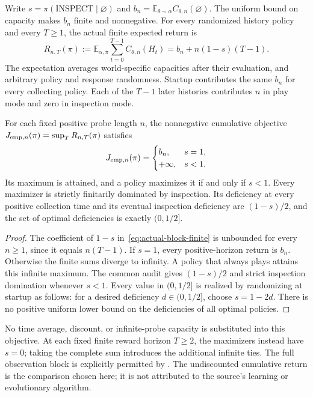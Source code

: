 Write $s=\pi(\mathrm{INSPECT}\mid\varnothing)$ and
$b_n=\mathbb E_{\theta\sim\alpha}C_{\theta,n}(\varnothing)$.
The uniform bound on capacity makes $b_n$ finite and nonnegative.
For every randomized history policy and every $T\ge1$, the actual finite
expected return is
\begin{equation}\label{eq:actual-block-finite}
 R_{n,T}(\pi):=\mathbb E_{\alpha,\pi}\sum_{t=0}^{T-1}C_{\theta,n}(H_t)
 =b_n+n(1-s)(T-1).
\end{equation}
The expectation averages world-specific capacities after their evaluation,
and arbitrary policy and response randomness. Startup contributes the same
$b_n$ for every collecting policy. Each of the $T-1$ later histories contributes
$n$ in play mode and zero in inspection mode.

\begin{proposition}\label{prop:actual-block-complete}
For each fixed positive probe length $n$, the nonnegative cumulative objective
$J_{{\rm emp},n}(\pi)=\sup_T R_{n,T}(\pi)$ satisfies
\[
 J_{{\rm emp},n}(\pi)=
 \begin{cases}b_n,&s=1,\\+\infty,&s<1.\end{cases}
\]
Its maximum is attained, and a policy maximizes it if and only if $s<1$.
Every maximizer is strictly finitarily dominated by inspection. Its deficiency
at every positive collection time and its eventual inspection deficiency are
$(1-s)/2$, and the set of optimal deficiencies is exactly $(0,1/2]$.
\end{proposition}
\begin{proof}
The coefficient of $1-s$ in~\eqref{eq:actual-block-finite} is unbounded for
every $n\ge1$, since it equals $n(T-1)$.
If $s=1$, every positive-horizon return is $b_n$. Otherwise the finite sums
diverge to infinity. A policy that always plays attains this infinite maximum.
The common audit gives $(1-s)/2$ and strict inspection domination whenever
$s<1$. Every value in $(0,1/2]$ is realized by randomizing at startup as follows: for a desired deficiency $d\in(0,1/2]$, choose $s=1-2d$. There is no positive uniform
lower bound on the deficiencies of all optimal policies.
\end{proof}

No time average, discount, or infinite-probe capacity is substituted into this
objective. At each fixed finite reward horizon $T\ge2$, the maximizers instead
have $s=0$; taking the complete sum introduces the additional infinite ties.
The full observation block is explicitly permitted by
\citet[Section~2.2, paragraph after Equation~(3)]{klyubin2005empowerment}.
The undiscounted cumulative return is the comparison chosen here; it is not
attributed to the source's learning or evolutionary algorithm.

